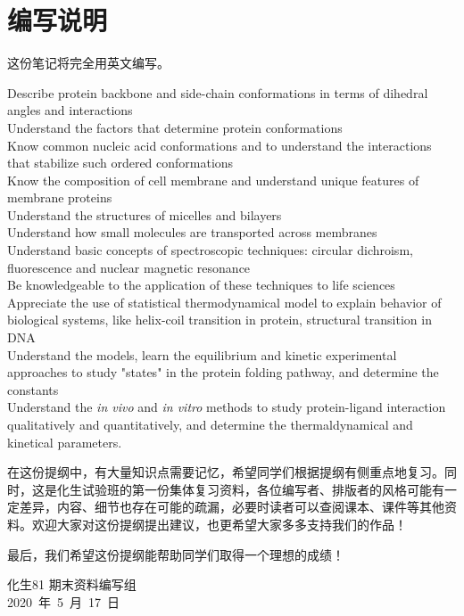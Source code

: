 \chapter*{编写说明}

这份笔记将完全用英文编写。

\vskip 1.5cm

\begin{tcolorbox}[title={\bfseries 课程目标}]
	 Describe protein backbone and side-chain conformations in terms of dihedral angles and interactions\\
	 Understand the factors that determine protein conformations\\
	 Know common nucleic acid conformations and to understand
	the interactions that stabilize such ordered conformations\\
	 Know the composition of cell membrane and understand unique features of membrane proteins\\
	 Understand the structures of micelles and bilayers\\
	 Understand how small molecules are transported across membranes\\
	 Understand basic concepts of spectroscopic techniques: circular dichroism, fluorescence and nuclear magnetic resonance\\
	 Be knowledgeable to the application of these techniques to life sciences\\
	 Appreciate the use of statistical thermodynamical model to explain behavior of biological systems, like helix-coil transition in protein, structural transition in DNA\\
	 Understand the models, learn the equilibrium and kinetic experimental approaches to study "states" in the protein folding pathway, and determine the constants\\
	 Understand the \textit{in vivo} and \textit{in vitro} methods to study protein-ligand interaction qualitatively and quantitatively, and determine the thermaldynamical and kinetical parameters.
\end{tcolorbox}


在这份提纲中，有大量知识点需要记忆，希望同学们根据提纲有侧重点地复习。同时，这是化生试验班的第一份集体复习资料，各位编写者、排版者的风格可能有一定差异，内容、细节也存在可能的疏漏，必要时读者可以查阅课本、课件等其他资料。欢迎大家对这份提纲提出建议，也更希望大家多多支持我们的作品！

最后，我们希望这份提纲能帮助同学们取得一个理想的成绩！

\vskip 1.5cm

\begin{flushright}
	化生81 期末资料编写组\\
	2020\ 年\ 5\ 月\ 17\ 日
\end{flushright}